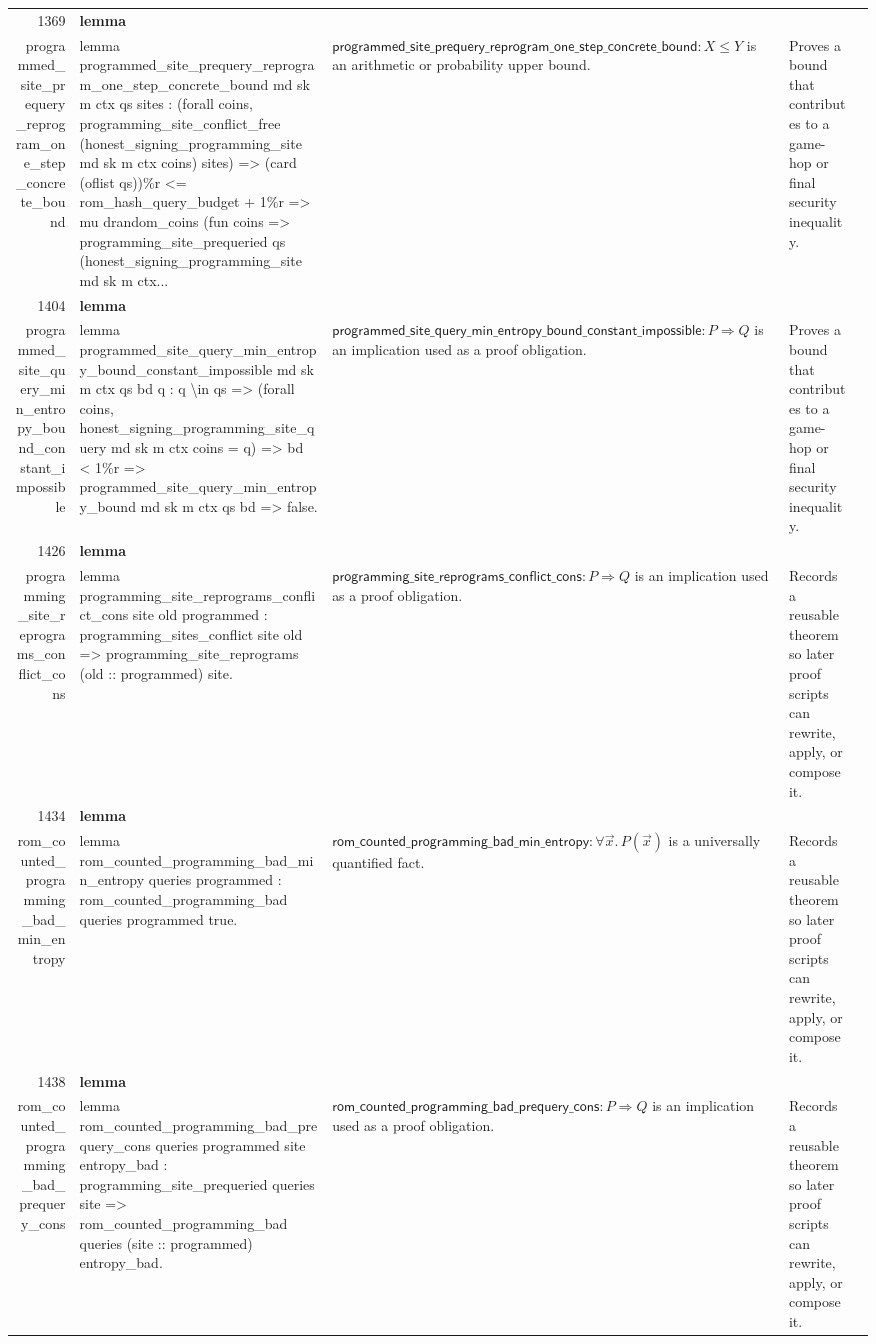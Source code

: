 \documentclass[10pt]{article}
\newcommand{\ec}[1]{\begingroup\ttfamily\scriptsize #1\endgroup}
\begin{document}
\begin{longtable}{r L{0.17\textwidth} L{0.26\textwidth} L{0.27\textwidth} L{0.20\textwidth}}
1369 & \textbf{lemma}\\\ec{programmed\_site\_prequery\_reprogram\_one\_step\_concrete\_bound} & \ec{lemma programmed\_site\_prequery\_reprogram\_one\_step\_concrete\_bound md sk m ctx qs sites : (forall coins, programming\_site\_conflict\_free (honest\_signing\_programming\_site md sk m ctx coins) sites) => (card (oflist qs))\%r <= rom\_hash\_query\_budget + 1\%r => mu drandom\_coins (fun coins => programming\_site\_prequeried qs (honest\_signing\_programming\_site md sk m ctx...} & \(\mathsf{programmed\_site\_prequery\_reprogram\_one\_step\_concrete\_bound} : X \le Y\) is an arithmetic or probability upper bound. & Proves a bound that contributes to a game-hop or final security inequality. \\
1404 & \textbf{lemma}\\\ec{programmed\_site\_query\_min\_entropy\_bound\_constant\_impossible} & \ec{lemma programmed\_site\_query\_min\_entropy\_bound\_constant\_impossible md sk m ctx qs bd q : q \textbackslash{}in qs => (forall coins, honest\_signing\_programming\_site\_query md sk m ctx coins = q) => bd < 1\%r => programmed\_site\_query\_min\_entropy\_bound md sk m ctx qs bd => false.} & \(\mathsf{programmed\_site\_query\_min\_entropy\_bound\_constant\_impossible} : P \Rightarrow Q\) is an implication used as a proof obligation. & Proves a bound that contributes to a game-hop or final security inequality. \\
1426 & \textbf{lemma}\\\ec{programming\_site\_reprograms\_conflict\_cons} & \ec{lemma programming\_site\_reprograms\_conflict\_cons site old programmed : programming\_sites\_conflict site old => programming\_site\_reprograms (old :: programmed) site.} & \(\mathsf{programming\_site\_reprograms\_conflict\_cons} : P \Rightarrow Q\) is an implication used as a proof obligation. & Records a reusable theorem so later proof scripts can rewrite, apply, or compose it. \\
1434 & \textbf{lemma}\\\ec{rom\_counted\_programming\_bad\_min\_entropy} & \ec{lemma rom\_counted\_programming\_bad\_min\_entropy queries programmed : rom\_counted\_programming\_bad queries programmed true.} & \(\mathsf{rom\_counted\_programming\_bad\_min\_entropy} : \forall \vec{x}.\, P(\vec{x})\) is a universally quantified fact. & Records a reusable theorem so later proof scripts can rewrite, apply, or compose it. \\
1438 & \textbf{lemma}\\\ec{rom\_counted\_programming\_bad\_prequery\_cons} & \ec{lemma rom\_counted\_programming\_bad\_prequery\_cons queries programmed site entropy\_bad : programming\_site\_prequeried queries site => rom\_counted\_programming\_bad queries (site :: programmed) entropy\_bad.} & \(\mathsf{rom\_counted\_programming\_bad\_prequery\_cons} : P \Rightarrow Q\) is an implication used as a proof obligation. & Records a reusable theorem so later proof scripts can rewrite, apply, or compose it. \\

\end{longtable}
\end{document}
